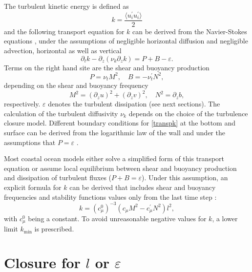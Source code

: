 The turbulent kinetic energy is defined as
\begin{equation}
 \label{TKE}
 k = \frac{\langle u_i^\prime u_i^\prime \rangle}{2}
\end{equation}
and the following transport equation for $k$ can be derived from the 
Navier-Stokes equations \citep[][]{Rodi1993}, under the assumptions of 
negligible horizontal diffusion and negligible advection, horizontal as 
well as vertical
\begin{equation}
 \label{transpk}
 \partial_t k - \partial_z (\nu_k \partial_z k) = P + B -\varepsilon.
\end{equation}
Terms on the right hand site are the shear and buoyancy production
\begin{equation}
 \label{PandB}
 P = \nu_t M^2, \quad B=-\nu^\prime_t N^2, 
\end{equation}
depending on the shear and buoyancy frequency
\begin{equation}
 \label{MundN}
 M^2 = (\partial_z u)^2 + (\partial_z v)^2, \quad N^2 = \partial_z b,
\end{equation}
respectively. $\varepsilon$ denotes the turbulent dissipation (see next 
sections). The calculation of the turbulent diffusivity $\nu_k$ depends on the 
choice of the turbulence closure model. Different boundary conditions for 
\eqref{transpk} at the bottom 
and surface can be derived from the logarithmic law of the wall and under the 
assumptions that $P = \varepsilon$ \citep[][]{gotm1999}.

Most coastal ocean models either solve a simplified form of this transport 
equation or assume local equilibrium between shear and buoyancy production and 
dissipation of turbulent fluxes ($P+B=\varepsilon$). Under this assumption, an 
explicit formula for $k$ can be derived that includes shear and buoyancy 
frequencies and stability functions values only from the last time step 
\citep[][]{UmlaufBurchard2005a}:
\begin{equation}
 \label{explick}
 k = (c_\mu^0)^{-3} (c_\mu M^2 - c_\mu^\prime N^2) l^2,
\end{equation}
 with $c_\mu^0$ being a constant. To avoid unreasonable negative values for 
$k$, a lower limit $k_{\min}$ is prescribed.

\section{Closure for $l$ or $\varepsilon$}

